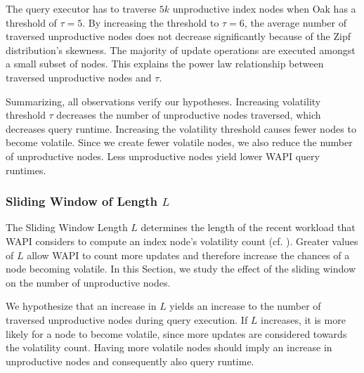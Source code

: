 \documentclass[abstracton,12pt]{scrartcl}
\theoremstyle{definition}
\begin{document}
The query executor has to traverse $5k$ unproductive index nodes when Oak has a
threshold of $\tau = 5$. By increasing the threshold to $\tau = 6$, the average
number of traversed unproductive nodes does not decrease significantly because
of the Zipf distribution's skewness. The majority of update operations are executed
amongst a small subset of nodes. This explains the power law relationship
between traversed unproductive nodes and $\tau$.

Summarizing, all observations verify our hypotheses.
Increasing volatility threshold $\tau$ decreases the number of unproductive
nodes traversed, which decreases query runtime. Increasing the volatility
threshold causes fewer nodes to become volatile. Since we create fewer volatile
nodes, we also reduce the number of unproductive nodes. Less unproductive
nodes yield lower WAPI query runtimes. 

\subsubsection{Sliding Window of Length $L$}

\label{sec:sliding-window}

The Sliding Window Length $L$ determines the length of the recent workload that WAPI
considers to compute an index node's volatility count (cf. ).
Greater values of $L$
allow WAPI to count more updates and therefore increase the chances of a node
becoming volatile. In this Section, we study
the effect of the sliding window on the number of unproductive nodes.

We hypothesize that an increase in $L$ yields an increase to the number of
traversed unproductive nodes during query execution. If $L$ increases, it is
more likely for a node to become volatile, since more updates are considered
towards the volatility count.
Having more volatile nodes should imply an increase in unproductive nodes and
consequently also query runtime.

\end{document}

